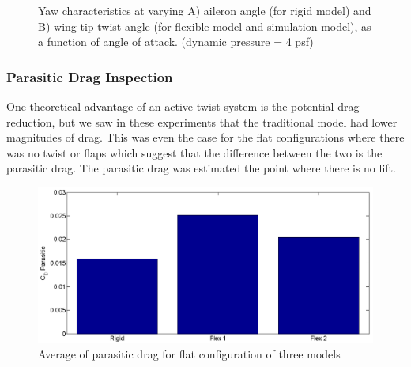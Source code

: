 \documentclass[11pt]{ucthesis}
\begin{document}
\begin{figure}[thpb]
\hfill
{}
\hfill
{}
\hfill
\caption{Yaw characteristics at varying A) aileron angle (for rigid model) and B) wing tip twist angle (for flexible model and simulation model), as a function of angle of attack. (dynamic pressure = 4 psf)}
\label{fig:Q4Yaw}
\end{figure}

\subsubsection{Parasitic Drag Inspection}

One theoretical advantage of an active twist system is the potential drag reduction, but we saw in these experiments that the traditional model had lower magnitudes of drag. This was even the case for the flat configurations where there was no twist or flaps which suggest that the difference between the two is the parasitic drag. The parasitic drag was estimated the point where there is no lift.

\begin{figure}[thpb]
\centering
\includegraphics[width=.75\linewidth]{Figures/CdPBulkCompare.png}
\caption{Average of parasitic drag for flat configuration of three models}
\label{fig:parasitic}
\end{figure}
\end{document}
